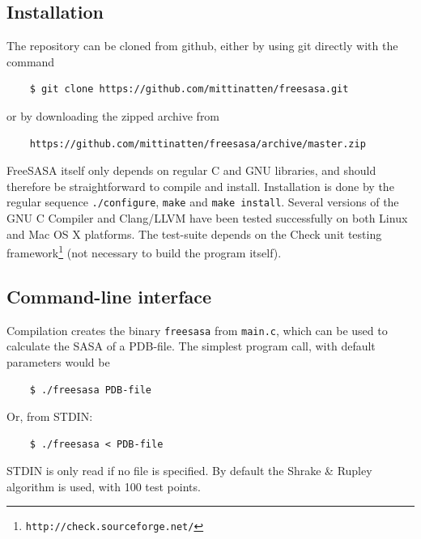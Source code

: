 \documentclass[a4paper,11pt]{article}
\begin{document}
\subsection{Installation} \label{sec:installing}

The repository can be cloned from github, either by using git directly
with the command
\begin{verbatim}
    $ git clone https://github.com/mittinatten/freesasa.git
\end{verbatim}
or by downloading the zipped archive from
\begin{verbatim}
    https://github.com/mittinatten/freesasa/archive/master.zip
\end{verbatim}
FreeSASA itself only depends on regular C and GNU libraries, and should
therefore be straightforward to compile and install. Installation is
done by the regular sequence \verb|./configure|, \verb|make| and
\verb|make install|. Several versions of the GNU C Compiler and
Clang/LLVM have been tested successfully on both Linux and Mac OS X
platforms. The test-suite depends on the Check unit testing
framework\footnote{\texttt{http://check.sourceforge.net/}} (not
necessary to build the program itself).

\subsection{Command-line interface}

Compilation creates the binary \verb|freesasa| from
\verb|main.c|, which can be used to calculate the SASA of a
PDB-file. The simplest program call, with default parameters would be
\begin{verbatim}
    $ ./freesasa PDB-file
\end{verbatim}
Or, from STDIN:
\begin{verbatim} 
    $ ./freesasa < PDB-file    
\end{verbatim}
STDIN is only read if no file is specified.  By default the Shrake \&
Rupley algorithm is used, with 100 test points. 
\end{document}
